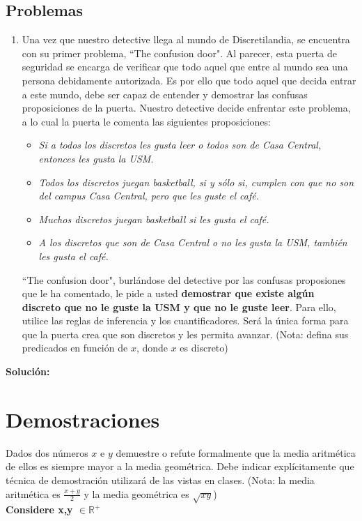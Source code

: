 \documentclass[letterpaper,10pt]{article}
\begin{document}
\subsection{Problemas}
\begin{enumerate}
    \item Una vez que nuestro detective llega al mundo de Discretilandia, se encuentra con su primer problema, ``The confusion door". Al parecer, esta puerta de seguridad se encarga de verificar que todo aquel que entre al mundo sea una persona debidamente autorizada. Es por ello que todo aquel que decida entrar a este mundo, debe ser capaz de entender y demostrar las confusas proposiciones de la puerta. Nuestro detective decide enfrentar este problema, a lo cual la puerta le comenta las siguientes proposiciones:
    \begin{itemize}
        \item \textit{Si a todos los discretos les gusta leer o todos son de Casa Central, entonces les gusta la USM.}
        \item \textit{Todos los discretos juegan basketball, si y sólo si, cumplen con que no son del campus Casa Central, pero que les guste el café.}
        \item \textit{Muchos discretos juegan basketball si les gusta el café.}
        \item \textit{A los discretos que son de Casa Central o no les gusta la USM, también les gusta el café.}
    \end{itemize}
    ``The confusion door", burlándose del detective por las confusas proposiones que le ha comentado, le pide a usted \textbf{demostrar que existe algún discreto que no le guste la USM y que no le guste leer}. Para ello, utilice las reglas de inferencia y los cuantificadores. Será la única forma para que la puerta crea que son discretos y les permita avanzar. (Nota: defina sus predicados en función de $x$, donde $x$ es discreto)
\end{enumerate}
\textbf{Solución:}
\section{Demostraciones}
Dados dos números $x$ e $y$ demuestre o refute formalmente que la media aritmética de ellos es siempre mayor a la media geométrica. Debe indicar explícitamente que técnica de demostración utilizará de las vistas en clases. (Nota: la media aritmética es $\frac{x+y}{2}$ y la media geométrica es $\sqrt{xy}$)\\ \textbf{Considere x,y $\in \mathbb R^+$}
\end{document}
